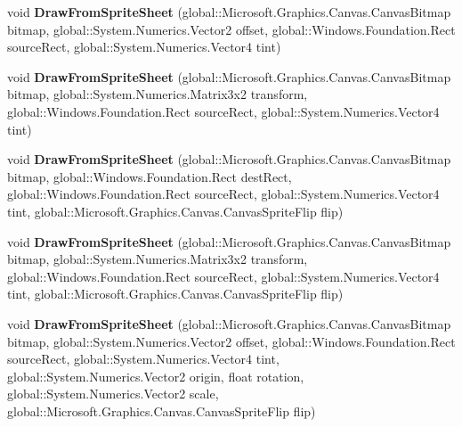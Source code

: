 \begin{DoxyCompactItemize}
void {\bfseries Draw\+From\+Sprite\+Sheet} (global\+::\+Microsoft.\+Graphics.\+Canvas.\+Canvas\+Bitmap bitmap, global\+::\+System.\+Numerics.\+Vector2 offset, global\+::\+Windows.\+Foundation.\+Rect source\+Rect, global\+::\+System.\+Numerics.\+Vector4 tint)
\item 
\mbox{\label{class_microsoft_1_1_graphics_1_1_canvas_1_1_canvas_sprite_batch_a757d700dcc20d105cec1a69997f48951}} 
void {\bfseries Draw\+From\+Sprite\+Sheet} (global\+::\+Microsoft.\+Graphics.\+Canvas.\+Canvas\+Bitmap bitmap, global\+::\+System.\+Numerics.\+Matrix3x2 transform, global\+::\+Windows.\+Foundation.\+Rect source\+Rect, global\+::\+System.\+Numerics.\+Vector4 tint)
\item 
\mbox{\label{class_microsoft_1_1_graphics_1_1_canvas_1_1_canvas_sprite_batch_a1a86d8b0f90e3534b1f78de4ab54d5b6}} 
void {\bfseries Draw\+From\+Sprite\+Sheet} (global\+::\+Microsoft.\+Graphics.\+Canvas.\+Canvas\+Bitmap bitmap, global\+::\+Windows.\+Foundation.\+Rect dest\+Rect, global\+::\+Windows.\+Foundation.\+Rect source\+Rect, global\+::\+System.\+Numerics.\+Vector4 tint, global\+::\+Microsoft.\+Graphics.\+Canvas.\+Canvas\+Sprite\+Flip flip)
\item 
\mbox{\label{class_microsoft_1_1_graphics_1_1_canvas_1_1_canvas_sprite_batch_afb583c7529206d1438558f6816c5e862}} 
void {\bfseries Draw\+From\+Sprite\+Sheet} (global\+::\+Microsoft.\+Graphics.\+Canvas.\+Canvas\+Bitmap bitmap, global\+::\+System.\+Numerics.\+Matrix3x2 transform, global\+::\+Windows.\+Foundation.\+Rect source\+Rect, global\+::\+System.\+Numerics.\+Vector4 tint, global\+::\+Microsoft.\+Graphics.\+Canvas.\+Canvas\+Sprite\+Flip flip)
\item 
\mbox{\label{class_microsoft_1_1_graphics_1_1_canvas_1_1_canvas_sprite_batch_adf9c3f59de40a640884b277dc8f5f51e}} 
void {\bfseries Draw\+From\+Sprite\+Sheet} (global\+::\+Microsoft.\+Graphics.\+Canvas.\+Canvas\+Bitmap bitmap, global\+::\+System.\+Numerics.\+Vector2 offset, global\+::\+Windows.\+Foundation.\+Rect source\+Rect, global\+::\+System.\+Numerics.\+Vector4 tint, global\+::\+System.\+Numerics.\+Vector2 origin, float rotation, global\+::\+System.\+Numerics.\+Vector2 scale, global\+::\+Microsoft.\+Graphics.\+Canvas.\+Canvas\+Sprite\+Flip flip)

\end{DoxyCompactItemize}
